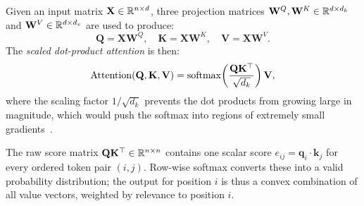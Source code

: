 Given an input matrix $\mathbf{X} \in \mathbb{R}^{n \times d}$, three projection matrices
$\mathbf{W}^Q, \mathbf{W}^K \in \mathbb{R}^{d \times d_k}$ and
$\mathbf{W}^V \in \mathbb{R}^{d \times d_v}$ are used to produce:
\begin{equation}
  \mathbf{Q} = \mathbf{X}\mathbf{W}^Q, \quad
  \mathbf{K} = \mathbf{X}\mathbf{W}^K, \quad
  \mathbf{V} = \mathbf{X}\mathbf{W}^V.
  \label{eq:qkv}
\end{equation}
The \emph{scaled dot-product attention} is then:
\begin{equation}
  \operatorname{Attention}(\mathbf{Q}, \mathbf{K}, \mathbf{V})
  = \operatorname{softmax}\!\left(\frac{\mathbf{Q}\mathbf{K}^\top}{\sqrt{d_k}}\right)\mathbf{V},
  \label{eq:attention}
\end{equation}
where the scaling factor $1/\sqrt{d_k}$ prevents the dot products from growing
large in magnitude, which would push the softmax into regions of extremely small
gradients~\cite{vaswani2017attention}.

\begin{remark}
  The raw score matrix $\mathbf{Q}\mathbf{K}^\top \in \mathbb{R}^{n \times n}$ contains one
  scalar score $e_{ij} = \mathbf{q}_i \cdot \mathbf{k}_j$ for every ordered token
  pair $(i, j)$.  Row-wise softmax converts these into a valid probability
  distribution; the output for position $i$ is thus a convex combination of all
  value vectors, weighted by relevance to position $i$.
\end{remark}

